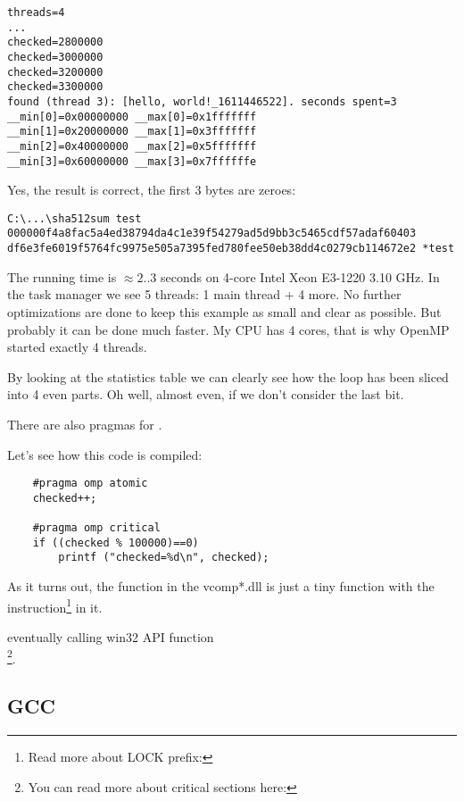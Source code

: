 \begin{lstlisting}
threads=4
...
checked=2800000
checked=3000000
checked=3200000
checked=3300000
found (thread 3): [hello, world!_1611446522]. seconds spent=3
__min[0]=0x00000000 __max[0]=0x1fffffff
__min[1]=0x20000000 __max[1]=0x3fffffff
__min[2]=0x40000000 __max[2]=0x5fffffff
__min[3]=0x60000000 __max[3]=0x7ffffffe
\end{lstlisting}

Yes, the result is correct, the first 3 bytes are zeroes:

\begin{lstlisting}
C:\...\sha512sum test
000000f4a8fac5a4ed38794da4c1e39f54279ad5d9bb3c5465cdf57adaf60403
df6e3fe6019f5764fc9975e505a7395fed780fee50eb38dd4c0279cb114672e2 *test
\end{lstlisting}

The running time is $\approx2..3$ seconds on 4-core Intel Xeon E3-1220 3.10 GHz.
In the task manager we see 5 threads: 
1 main thread + 4 more.
No further optimizations are done to keep this example as small and clear as possible.
But probably it can be done much faster.
My \ac{CPU} has 4 cores, that is why OpenMP 
started exactly 4 threads.

By looking at the statistics table we can clearly see how the loop has been sliced into 4 even parts.
Oh well, almost even, if we don't consider the last bit.

There are also pragmas for 
.

Let's see how this code is compiled:

\begin{lstlisting}
	#pragma omp atomic
	checked++;

	#pragma omp critical
	if ((checked % 100000)==0)
		printf ("checked=%d\n", checked);
\end{lstlisting}



As it turns out, the  
function in the vcomp*.dll 
is just a tiny function
with the  instruction\footnote{
Read more about LOCK prefix: } in it.

eventually calling win32 \ac{API} function \\
\footnote{You can read more about critical sections 
here: }.

\subsection{GCC}

